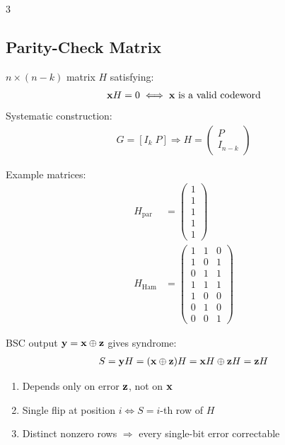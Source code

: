 \documentclass[12pt, a4paper]{article}
\begin{document}
\begin{multicols*}{3}
\colbreak
\subsection{Parity-Check Matrix}
$n\times(n-k)$ matrix $H$ satisfying:
\begin{align*}
  \mathbf{x} H=0\iff\mathbf{x}\text{ is a valid codeword}
\end{align*}
Systematic construction:
\begin{align*}
  G=[I_k\;P]\Rightarrow H=\begin{pmatrix}P\\ I_{n-k}\end{pmatrix}
\end{align*}

Example matrices:
\begin{align*}
  H_{\text{par}}&=\begin{pmatrix}1\\ 1\\ 1\\ 1\\ 1\end{pmatrix}\\
  H_{\text{Ham}}&=\begin{pmatrix}
    1&1&0\\
    1&0&1\\
    0&1&1\\
    1&1&1\\
    1&0&0\\
    0&1&0\\
    0&0&1
  \end{pmatrix}
\end{align*}

BSC output $\mathbf{y}=\mathbf{x}\oplus\mathbf{z}$ gives syndrome:
\begin{align*}
  S=\mathbf{y} H=(\mathbf{x}\oplus\mathbf{z})H=\mathbf{x} H\oplus\mathbf{z} H=\mathbf{z} H
\end{align*}
\begin{enumerate}[\roman*.]
  \item Depends only on error $\mathbf{z}$, not on $\mathbf{x}$
  \item Single flip at position $i\iff S=i$-th row of $H$
  \item Distinct nonzero rows $\Rightarrow$ every single-bit error correctable
\end{enumerate}

\colbreak

\end{multicols*}
\end{document}
